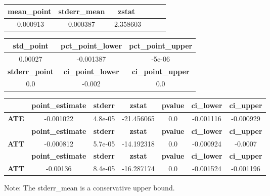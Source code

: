 \begin{center}
\begin{tabular}{cccccc}
\toprule
 \textbf{mean\_point}  &   \textbf{stderr\_mean}    &       \textbf{zstat}        \\
\midrule
      -0.000913        &          0.000387          &         -2.358603           \\
\bottomrule
\end{tabular}
\begin{tabular}{ccc}
\textbf{std\_point} & \textbf{pct\_point\_lower} & \textbf{pct\_point\_upper}  \\
\midrule
      0.00027       &         -0.001387          &           -5e-06            \\
\textbf{stderr\_point} & \textbf{ci\_point\_lower} & \textbf{ci\_point\_upper}  \\
\midrule
         0.0           &           -0.002          &            0.0             \\
\bottomrule
\end{tabular}
\begin{tabular}{lcccccc}
             & \textbf{point\_estimate} & \textbf{stderr} & \textbf{zstat} & \textbf{pvalue} & \textbf{ci\_lower} & \textbf{ci\_upper}  \\
\midrule
\textbf{ATE} &        -0.001022         &     4.8e-05     &   -21.456065   &       0.0       &     -0.001116      &     -0.000929       \\
             & \textbf{point\_estimate} & \textbf{stderr} & \textbf{zstat} & \textbf{pvalue} & \textbf{ci\_lower} & \textbf{ci\_upper}  \\
\midrule
\textbf{ATT} &        -0.000812         &     5.7e-05     &   -14.192318   &       0.0       &     -0.000924      &      -0.0007        \\
             & \textbf{point\_estimate} & \textbf{stderr} & \textbf{zstat} & \textbf{pvalue} & \textbf{ci\_lower} & \textbf{ci\_upper}  \\
\midrule
\textbf{ATT} &         -0.00136         &     8.4e-05     &   -16.287174   &       0.0       &     -0.001524      &     -0.001196       \\
\bottomrule
\end{tabular}
\end{center}

Note: The stderr_mean is a conservative upper bound.